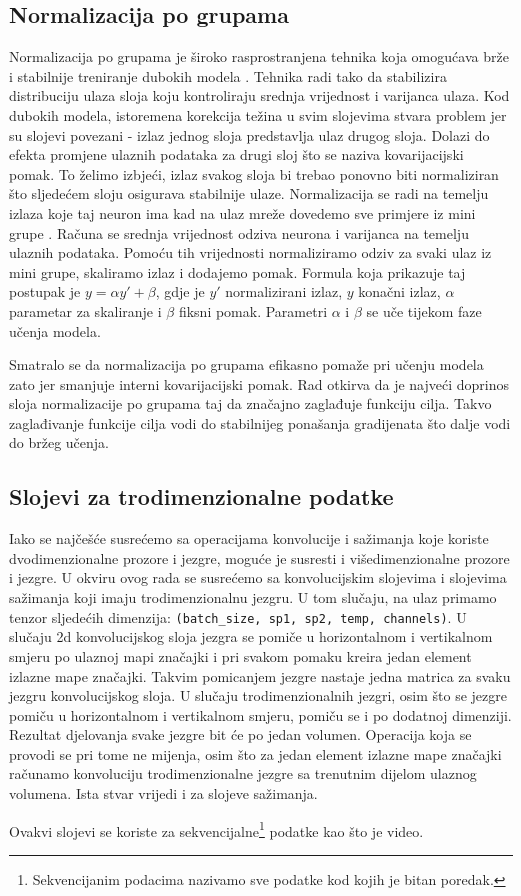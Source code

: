 \documentclass[times, utf8, diplomski,  numeric]{fer}
\begin{document}
\subsection{Normalizacija po grupama}
Normalizacija po grupama  je široko rasprostranjena tehnika koja omogućava brže i stabilnije treniranje dubokih modela \cite{NIPS2018_7515}. Tehnika radi tako da stabilizira distribuciju ulaza sloja koju kontroliraju srednja vrijednost i varijanca ulaza. Kod dubokih modela, istoremena korekcija težina u svim slojevima stvara problem jer su slojevi povezani - izlaz jednog sloja predstavlja ulaz drugog sloja. Dolazi do efekta promjene ulaznih podataka za drugi sloj što se naziva kovarijacijski pomak. To želimo izbjeći, izlaz svakog sloja bi trebao ponovno biti normaliziran što sljedećem sloju osigurava stabilnije ulaze. Normalizacija se radi na temelju izlaza koje taj neuron ima kad na ulaz mreže dovedemo sve primjere iz mini grupe \cite{du-web}. Računa se srednja vrijednost odziva neurona i varijanca na temelju ulaznih podataka. Pomoću tih vrijednosti normaliziramo odziv za svaki ulaz iz mini grupe, skaliramo izlaz i dodajemo pomak. Formula koja prikazuje taj postupak je $y = \alpha y' + \beta $, gdje je $y'$ normalizirani izlaz, $y$ konačni izlaz, $\alpha$ parametar za skaliranje i $\beta$ fiksni pomak. Parametri $\alpha$ i $\beta$ se uče tijekom faze učenja modela.
\par
Smatralo se da normalizacija po grupama efikasno pomaže pri učenju modela zato jer smanjuje interni kovarijacijski pomak. Rad \cite{NIPS2018_7515} otkirva da je najveći doprinos sloja normalizacije po grupama taj da značajno zaglađuje funkciju cilja. Takvo zaglađivanje funkcije cilja vodi do stabilnijeg ponašanja gradijenata što dalje vodi do bržeg učenja.  
\subsection{Slojevi za trodimenzionalne podatke}
Iako se najčešće susrećemo sa operacijama konvolucije i sažimanja koje koriste dvodimenzionalne prozore i jezgre, moguće je susresti i višedimenzionalne prozore i jezgre. U okviru ovog rada se susrećemo sa konvolucijskim slojevima i slojevima sažimanja koji imaju trodimenzionalnu jezgru. U tom slučaju, na ulaz primamo tenzor sljedećih dimenzija: \verb|(batch_size, sp1, sp2, temp, channels)|. U slučaju 2d konvolucijskog sloja jezgra se pomiče u horizontalnom i vertikalnom smjeru po ulaznoj mapi značajki i pri svakom pomaku kreira jedan element izlazne mape značajki. Takvim pomicanjem jezgre nastaje jedna matrica za svaku jezgru konvolucijskog sloja. U slučaju trodimenzionalnih jezgri, osim što se jezgre pomiču u horizontalnom i vertikalnom smjeru, pomiču se i po dodatnoj dimenziji. Rezultat djelovanja svake jezgre bit će po jedan volumen. Operacija koja se provodi se pri tome ne mijenja, osim što za jedan element izlazne mape značajki računamo konvoluciju trodimenzionalne jezgre sa trenutnim dijelom ulaznog volumena. Ista stvar vrijedi i za slojeve sažimanja.
\par
Ovakvi slojevi se koriste za sekvencijalne\footnote{Sekvencijanim podacima nazivamo sve podatke kod kojih je bitan poredak.} podatke kao što je video.
\end{document}
